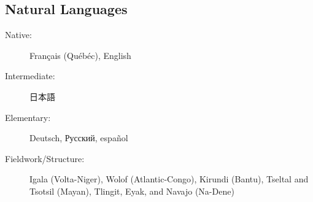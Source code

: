 \documentclass[margin,line]{resume}
\begin{document}
\begin{resume}
	\vspace{-0.9em}

	\section{\mysidestyle Natural Languages}\vspace{2mm}
	\begin{description}
		\item[Native:] Français (Qu\'{e}b\'{e}c), English
		\item[Intermediate:] \begin{CJK}{UTF8}{min}日本語\end{CJK}
		\item[Elementary:] Deutsch, Русский, español
		\item[Fieldwork/Structure:] Igala (Volta-Niger), Wolof (Atlantic-Congo), Kirundi (Bantu),
		      Tseltal and Tsotsil (Mayan), Tlingit, Eyak, and Navajo (Na-Dene)%
	\end{description}

	\BgThispage

\end{resume}
\end{document}
